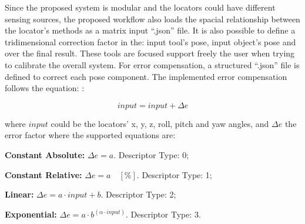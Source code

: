 
Since the proposed system is modular and the locators could have different sensing sources, the proposed workflow also loads the spacial relationship between the locator's methods as a matrix input ``.json'' file. It is also possible to define a tridimensional correction factor in the: input tool's pose, input object's pose and over the final result. These tools are focused support freely the user when trying to calibrate the overall system. For error compensation, a structured ``.json'' file is defined to correct each pose component. The implemented error compensation follows the equation: : 

\begin{equation}
	input = input + \Delta e
\end{equation} 

\noindent where $input$ could be the locators' x, y, z, roll, pitch and yaw angles, and $\Delta e$ the error factor where the supported equations are:

\begin{itemize_jp}
	\item \textbf{Constant Absolute:} $\Delta e = a$. Descriptor Type: 0;
	\item \textbf{Constant Relative:} $\Delta e = a\quad[\%]$. Descriptor Type: 1;
	\item \textbf{Linear:} $\Delta e = a \cdot input + b$. Descriptor Type: 2;
	\item \textbf{Exponential:} $\Delta e = a \cdot b ^{(\alpha \cdot input)}$. Descriptor Type: 3. 
\end{itemize_jp} 

